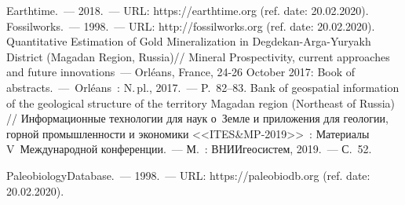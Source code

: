 \begin{thebibliography}{99}
\bibitem{}Earthtime.~--- 2018.~--- URL: https://earthtime.org  (ref. date: 20.02.2020).
\bibitem{}Fossilworks.~--- 1998.~--- URL: http://fossilworks.org  (ref. date: 20.02.2020).
\bibitem{} Quantitative Estimation of Gold Mineralization in Degdekan-Arga-Yuryakh District (Magadan Region, Russia)// Mineral Prospectivity, current approaches and future innovations~--- Orléans, France, 24-26 October 2017: Book of abstracts.~--- Orléans~: N.\,pl., 2017.~--- P.~82--83.
\bibitem{} Bank of geospatial information of the geological structure of the territory Magadan region (Northeast of Russia) // Информационные технологии для наук о~Земле и приложения для геологии, горной промышленности и экономики <<ITES\&MP-2019>>~: Материалы V~Международной конференции.~--- М.~: ВНИИгеосистем, 2019.~--- С.~52.

\bibitem{}PaleobiologyDatabase.~--- 1998.~--- URL: https://paleobiodb.org  (ref. date: 20.02.2020).

\end{thebibliography}
